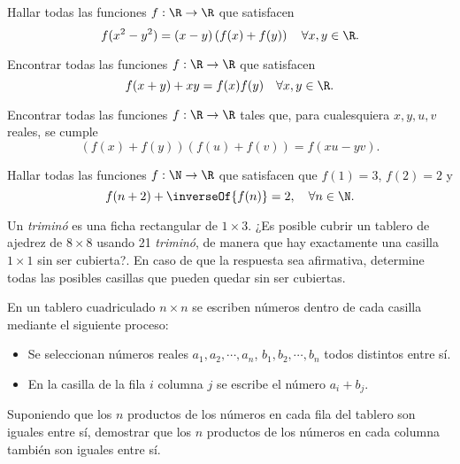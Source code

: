 \begin{section-problem}
    Hallar todas las funciones $f: \R \rightarrow \R$ que satisfacen
    \[f(x^2 - y^2) = (x - y)\left(f(x) + f(y)\right) \quad \forall x, y \in \R.\]
\end{section-problem}

\begin{section-problem}
    Encontrar todas las funciones $f: \R \rightarrow \R$ que satisfacen
    \[f(x + y) + xy = f(x)f(y) \quad \forall x, y \in \R.\]
\end{section-problem}

\begin{section-problem}
    Encontrar todas las funciones $f: \R \rightarrow \R$ tales que, para cualesquiera $x, y, u, v$ reales, se cumple
    \[\left(f(x) + f(y)\right)\left(f(u) + f(v)\right) = f(xu - yv).\]
\end{section-problem}

\begin{section-problem}
    Hallar todas las funciones $f: \N \rightarrow \R$ que satisfacen que $f(1) = 3$, $f(2) =  2$ y
    \[f(n + 2) + \inverseOf{f(n)} = 2, \quad \forall n \in \N.\]
\end{section-problem}

\begin{section-problem}
    Un \textit{triminó} es una ficha rectangular de $1\times 3$.
    ¿Es posible cubrir un tablero de ajedrez de $8 \times 8$ usando 21 \textit{triminó}, de manera que hay exactamente una casilla $1 \times 1$ sin ser cubierta?.
    En caso de que la respuesta sea afirmativa, determine todas las posibles casillas que pueden quedar sin ser cubiertas.
\end{section-problem}

\begin{section-problem}
    En un tablero cuadriculado $n \times n$ se escriben números dentro de cada casilla mediante el siguiente proceso:
    \begin{itemize}
        \item Se seleccionan números reales $a_1, a_2, \cdots, a_n$, $b_1, b_2, \cdots, b_n$ todos distintos entre sí.
        \item En la casilla de la fila $i$ columna $j$ se escribe el número $a_i + b_j$.
    \end{itemize}
    Suponiendo que los $n$ productos de los números en cada fila del tablero son iguales entre sí, demostrar que los $n$ productos de los números en cada columna también son iguales entre sí.
\end{section-problem}

